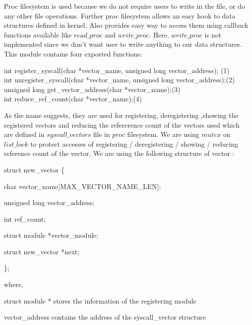 \documentclass[11pt]{article}
\begin{document}
\medskip
\noindent
Proc filesystem is used because we do not require users to write in the file, or do any other file operations. 
Further proc filesystem allows an easy hook to data structures defined in kernel. Also provides easy way to access them using
 callback functions available like $read\_proc$ and $write\_proc$.
 Here, $write\_proc$ is not implemented since we don't want user to write anything to our data structures.
This module contains four exported functions:

\begin{center}
	 int register\_syscall(char *vector\_name, unsigned long vector\_address); \hfill(1)\\
	int unregister\_syscall(char *vector\_name, unsigned long vector\_address);\hfill(2)\\
	unsigned long get\_vector\_address(char *vector\_name);\hfill(3)\\ 
	int reduce\_ref\_count(char *vector\_name);\hfill(4)
\end{center}

As the name suggests, they are used for registering, deregistering ,showing the registered vectors and reducing the refererence count of the vectors used which are defined in $syscall\_vectors$ file in $proc$ filesystem. We are using $mutex$ on $list\_lock$ to protect accesses of registering / deregistering / showing / reducing reference count of the vector.  We are using the following structure of vector :

\medskip
\noindent
struct new\_vector \{   

\hspace{2.9cm}char vector\_name[MAX\_VECTOR\_NAME\_LEN];

\hspace{2.9cm}unsigned long vector\_address;

\hspace{2.9cm}int ref\_count;

\hspace{2.9cm}struct module *vector\_module;

\hspace{2.9cm}struct new\_vector *next;

\hspace{2.6cm}\};

\medskip
\noindent
where, 

struct module * stores the information of the registering module

vector\_address contains the address of the syscall\_vector structure
\end{document}
